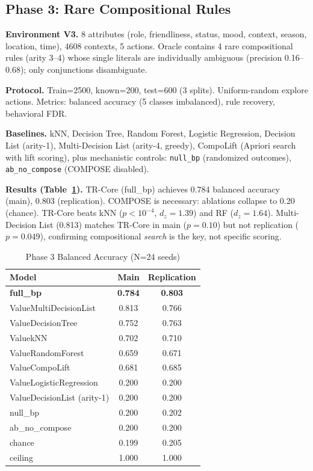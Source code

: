 \documentclass[11pt]{article}
\begin{document}
\subsection{Phase 3: Rare Compositional Rules}
\label{sec:phase3}

\textbf{Environment V3.} 8 attributes (role, friendliness, status, mood, context, season, location, time), 4608 contexts, 5 actions. Oracle contains 4 rare compositional rules (arity 3--4) whose single literals are individually ambiguous (precision 0.16--0.68); only conjunctions disambiguate.

\textbf{Protocol.} Train=2500, known=200, test=600 (3 splits). Uniform-random explore actions. Metrics: balanced accuracy (5 classes imbalanced), rule recovery, behavioral FDR.

\textbf{Baselines.} kNN, Decision Tree, Random Forest, Logistic Regression, Decision List (arity-1), Multi-Decision List (arity-4, greedy), CompoLift (Apriori search with lift scoring), plus mechanistic controls: \texttt{null\_bp} (randomized outcomes), \texttt{ab\_no\_compose} (COMPOSE disabled).

\textbf{Results (Table~\ref{tab:phase3}).} TR-Core (full\_bp) achieves 0.784 balanced accuracy (main), 0.803 (replication). COMPOSE is necessary: ablations collapse to 0.20 (chance). TR-Core beats kNN ($p < 10^{-4}$, $d_z=1.39$) and RF ($d_z=1.64$). Multi-Decision List (0.813) matches TR-Core in main ($p=0.10$) but not replication ($p=0.049$), confirming compositional \emph{search} is the key, not specific scoring.

\begin{table}[htbp]
\centering
\caption{Phase 3 Balanced Accuracy (N=24 seeds)}
\label{tab:phase3}
\begin{tabular}{lcc}
\toprule
Model & Main & Replication \\
\midrule
\textbf{full\_bp} & \textbf{0.784} & \textbf{0.803} \\
ValueMultiDecisionList & 0.813 & 0.766 \\
ValueDecisionTree & 0.752 & 0.763 \\
ValuekNN & 0.702 & 0.710 \\
ValueRandomForest & 0.659 & 0.671 \\
ValueCompoLift & 0.681 & 0.685 \\
ValueLogisticRegression & 0.200 & 0.200 \\
ValueDecisionList (arity-1) & 0.200 & 0.200 \\
null\_bp & 0.200 & 0.202 \\
ab\_no\_compose & 0.200 & 0.200 \\
chance & 0.199 & 0.205 \\
ceiling & 1.000 & 1.000 \\
\bottomrule
\end{tabular}
\end{table}
\end{document}
